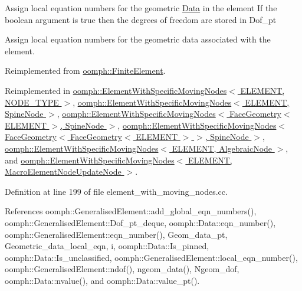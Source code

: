 Assign local equation numbers for the geometric \hyperlink{classoomph_1_1Data}{Data} in the element If the boolean argument is true then the degrees of freedom are stored in Dof\+\_\+pt

Assign local equation numbers for the geometric data associated with the element. 

Reimplemented from \hyperlink{classoomph_1_1FiniteElement_a564ba080f68132762510b1ec9465b05d}{oomph\+::\+Finite\+Element}.



Reimplemented in \hyperlink{classoomph_1_1ElementWithSpecificMovingNodes_a82531e83f80254735130558f0562cdff}{oomph\+::\+Element\+With\+Specific\+Moving\+Nodes$<$ E\+L\+E\+M\+E\+N\+T, N\+O\+D\+E\+\_\+\+T\+Y\+P\+E $>$}, \hyperlink{classoomph_1_1ElementWithSpecificMovingNodes_a82531e83f80254735130558f0562cdff}{oomph\+::\+Element\+With\+Specific\+Moving\+Nodes$<$ E\+L\+E\+M\+E\+N\+T, Spine\+Node $>$}, \hyperlink{classoomph_1_1ElementWithSpecificMovingNodes_a82531e83f80254735130558f0562cdff}{oomph\+::\+Element\+With\+Specific\+Moving\+Nodes$<$ Face\+Geometry$<$ E\+L\+E\+M\+E\+N\+T $>$, Spine\+Node $>$}, \hyperlink{classoomph_1_1ElementWithSpecificMovingNodes_a82531e83f80254735130558f0562cdff}{oomph\+::\+Element\+With\+Specific\+Moving\+Nodes$<$ Face\+Geometry$<$ Face\+Geometry$<$ E\+L\+E\+M\+E\+N\+T $>$ $>$, Spine\+Node $>$}, \hyperlink{classoomph_1_1ElementWithSpecificMovingNodes_a82531e83f80254735130558f0562cdff}{oomph\+::\+Element\+With\+Specific\+Moving\+Nodes$<$ E\+L\+E\+M\+E\+N\+T, Algebraic\+Node $>$}, and \hyperlink{classoomph_1_1ElementWithSpecificMovingNodes_a82531e83f80254735130558f0562cdff}{oomph\+::\+Element\+With\+Specific\+Moving\+Nodes$<$ E\+L\+E\+M\+E\+N\+T, Macro\+Element\+Node\+Update\+Node $>$}.



Definition at line 199 of file element\+\_\+with\+\_\+moving\+\_\+nodes.\+cc.



References oomph\+::\+Generalised\+Element\+::add\+\_\+global\+\_\+eqn\+\_\+numbers(), oomph\+::\+Generalised\+Element\+::\+Dof\+\_\+pt\+\_\+deque, oomph\+::\+Data\+::eqn\+\_\+number(), oomph\+::\+Generalised\+Element\+::eqn\+\_\+number(), Geom\+\_\+data\+\_\+pt, Geometric\+\_\+data\+\_\+local\+\_\+eqn, i, oomph\+::\+Data\+::\+Is\+\_\+pinned, oomph\+::\+Data\+::\+Is\+\_\+unclassified, oomph\+::\+Generalised\+Element\+::local\+\_\+eqn\+\_\+number(), oomph\+::\+Generalised\+Element\+::ndof(), ngeom\+\_\+data(), Ngeom\+\_\+dof, oomph\+::\+Data\+::nvalue(), and oomph\+::\+Data\+::value\+\_\+pt().



